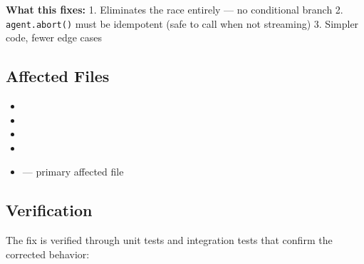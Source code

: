 \textbf{What this fixes:}
1. Eliminates the race entirely — no conditional branch
2. \texttt{agent.abort()} must be idempotent (safe to call when not streaming)
3. Simpler code, fewer edge cases


\subsection*{Affected Files}
\begin{itemize}
    \item {}
    \item {}
    \item {}
    \item {}
    \item {} — primary affected file
\end{itemize}

\subsection*{Verification}
The fix is verified through unit tests and integration tests that confirm the corrected behavior:

